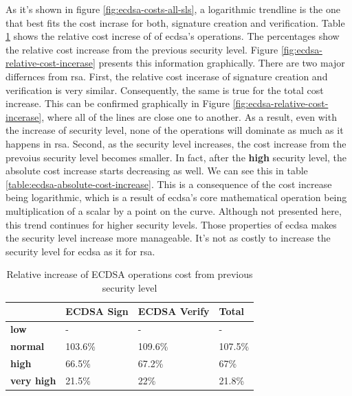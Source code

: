 \documentclass{llncs}
\begin{document}
As it's shown in figure \ref{fig:ecdsa-costs-all-sls}, a logarithmic trendline is the one that best fits the cost incrase for both, 
signature creation and verification.
Table \ref{table:ecdsa-relative-cost-increase} shows the relative cost increse of of \gls{ecdsa}'s operations. The percentages 
show the relative cost increase from the previous security level. Figure \ref{fig:ecdsa-relative-cost-incerase} presents this information
graphically. There are two major differnces from \gls{rsa}. First, the relative cost incerase 
of signature creation and verification is very similar. Consequently, the same is true for the total cost increase. This can be confirmed
graphically in Figure \ref{fig:ecdsa-relative-cost-incerase}, where all of the lines are 
close one to another. As a result, even with the increase of security level, none of the operations will dominate as much as it happens
in \gls{rsa}. Second, as the security level increases, the cost increase from the prevoius security level becomes smaller. In fact, after the
\textbf{high} security level, the absolute cost increase starts decreasing as well. We can see this in table \ref{table:ecdsa-absolute-cost-increase}.
This is a consequence of the cost increase being logarithmic, which is a result of \gls{ecdsa}'s core mathematical operation being
multiplication of a scalar by a point on the curve. Although not presented here, this trend continues for higher security levels. 
Those properties of \gls{ecdsa} makes the security level increase more manageable. It's not as costly to increase the security level for 
\gls{ecdsa} as it for \gls{rsa}.

\begin{table}[]
  \begin{tabular}{|l|l|l|l|}
    \hline
  & \textbf{ECDSA Sign} & \textbf{ECDSA Verify} & \textbf{Total} \\ \hline
  \textbf{low}       & -                 & -                   & -              \\ \hline
  \textbf{normal}    & 103.6\%           & 109.6\%             & 107.5\%        \\ \hline
  \textbf{high}      & 66.5\%            & 67.2\%              & 67\%           \\ \hline
  \textbf{very high} & 21.5\%            & 22\%                & 21.8\%         \\ \hline
  \end{tabular}
  \caption{\label{table:ecdsa-relative-cost-increase} Relative increase of ECDSA operations cost from previous security level}
  \end{table}
\end{document}
